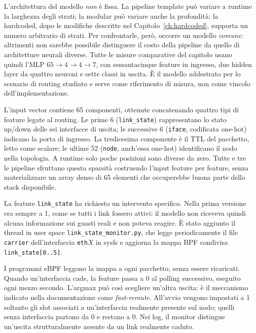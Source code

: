 \documentclass[binding=0.6cm,italian,oneside,noexaminfo]{sapthesis}
\begin{document}
L'architettura del modello \emph{non} è fissa. La pipeline template può variare a runtime la larghezza degli strati; la modular può variare anche la profondità; la hardcoded, dopo le modifiche descritte nel Capitolo~\ref{ch:hardcoded}, supporta un numero arbitrario di strati. Per confrontarle, però, occorre un modello \emph{comune}: altrimenti non sarebbe possibile distinguere il costo della pipeline da quello di architetture neurali diverse. Tutte le misure comparative del capitolo usano quindi l'MLP $65 \rightarrow 4 \rightarrow 4 \rightarrow 7$, con sessantacinque feature in ingresso, due hidden layer da quattro neuroni e sette classi in uscita. È il modello addestrato per lo scenario di routing studiato e serve come riferimento di misura, non come vincolo dell'implementazione.

L'input vector contiene 65 componenti, ottenute concatenando quattro tipi di feature legate al routing. Le prime 6 (\texttt{link\_state}) rappresentano lo stato up/down delle sei interfacce di uscita; le successive 6 (\texttt{iface}, codificata one-hot) indicano la porta di ingresso. La tredicesima componente è il TTL del pacchetto, letto come scalare; le ultime 52 (\texttt{node}, anch'essa one-hot) identificano il nodo nella topologia. A runtime solo poche posizioni sono diverse da zero. Tutte e tre le pipeline sfruttano questa sparsità costruendo l'input feature per feature, senza materializzare un array denso di 65 elementi che occuperebbe buona parte dello stack disponibile.

La feature \texttt{link\_state} ha richiesto un intervento specifico. Nella prima versione era sempre a 1, come se tutti i link fossero attivi: il modello non riceveva quindi alcuna informazione sui guasti reali e non poteva reagire. È stato aggiunto il thread in user space \texttt{link\_state\_monitor.py}, che legge periodicamente il file \texttt{carrier} dell'interfaccia \texttt{eth$X$} in sysfs e aggiorna la mappa BPF condivisa \texttt{link\_state[0..5]}.

I programmi eBPF leggono la mappa a ogni pacchetto, senza essere ricaricati. Quando un'interfaccia cade, la feature passa a 0 al polling successivo, eseguito ogni mezzo secondo. L'argmax può così scegliere un'altra uscita: è il meccanismo indicato nella documentazione come \emph{fast-reroute}. All'avvio vengono impostati a 1 soltanto gli slot associati a un'interfaccia realmente presente sul nodo; quelli senza interfaccia partono da 0 e restano a 0. Nei log, il monitor distingue un'uscita strutturalmente assente da un link realmente caduto.
\end{document}
